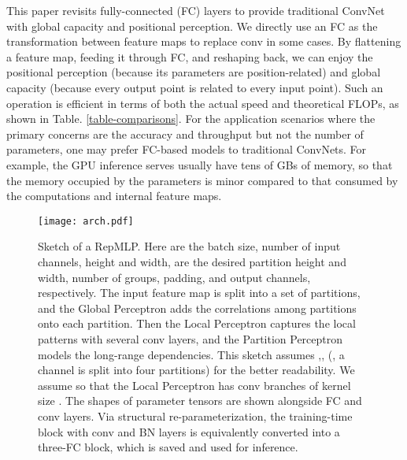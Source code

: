 \documentclass[10pt,twocolumn,letterpaper]{article}
\begin{document}
This paper revisits fully-connected (FC) layers to provide traditional ConvNet with global capacity and positional perception. We directly use an FC as the transformation between feature maps to replace conv in some cases. By flattening a feature map, feeding it through FC, and reshaping back, we can enjoy the positional perception (because its parameters are position-related) and global capacity (because every output point is related to every input point). Such an operation is efficient in terms of both the actual speed and theoretical FLOPs, as shown in Table. \ref{table-comparisons}. For the application scenarios where the primary concerns are the accuracy and throughput but not the number of parameters, one may prefer FC-based models to traditional ConvNets. For example, the GPU inference serves usually have tens of GBs of memory, so that the memory occupied by the parameters is minor compared to that consumed by the computations and internal feature maps.
\begin{figure*}
	\begin{center}
		\texttt{[image: arch.pdf]}
		\vspace{-0.25in}
		\caption{Sketch of a RepMLP. Here  are the batch size, number of input channels, height and width,  are the desired partition height and width, number of groups, padding, and output channels, respectively. The input feature map is split into a set of partitions, and the Global Perceptron adds the correlations among partitions onto each partition. Then the Local Perceptron captures the local patterns with several conv layers, and the Partition Perceptron models the long-range dependencies. This sketch assumes ,, (\ie, a channel is split into four partitions) for the better readability. We assume  so that the Local Perceptron has conv branches of kernel size . The shapes of parameter tensors are shown alongside FC and conv layers. Via structural re-parameterization, the training-time block with conv and BN layers is equivalently converted into a three-FC block, which is saved and used for inference.}
		\label{fig-arch}
		\vspace{-0.25in}
	\end{center}
\end{figure*}
\end{document}

